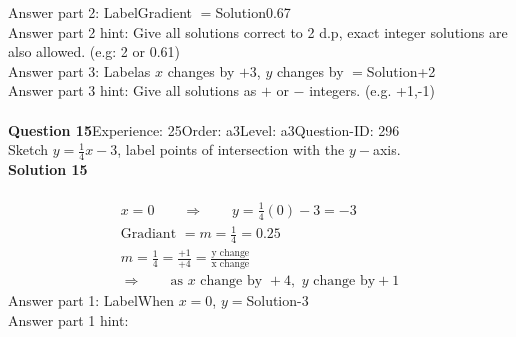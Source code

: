 \documentclass{article}
\begin{document}
Answer part 2: \hspace{10pt}Label\hspace{10pt}Gradient $=$\hspace{10pt}Solution\hspace{10pt}0.67\\
Answer part 2 hint: \hspace{15pt}Give all solutions correct to 2 d.p, exact integer solutions are also allowed. (e.g: 2 or 0.61)\\
Answer part 3: \hspace{10pt}Label\hspace{10pt}as $x$ changes by $+3$, $y$ changes by $=$\hspace{10pt}Solution\hspace{10pt}+2\\
Answer part 3 hint: \hspace{15pt}Give all solutions as $+$ or $-$ integers. (e.g. +1,-1)\\
\\[4pt]
\noindent\textbf{Question 15}\hspace{20pt}Experience: 25\hspace{20pt}Order: a3\hspace{20pt}Level: a3\hspace{20pt}Question-ID: 296\\[2pt]
Sketch $y=\displaystyle\frac{1}{4}x-3$, label points of intersection with the $y-$axis.\\[4pt]
\noindent\textbf{Solution 15}\\[2pt]
\\[-35pt]\begin{align*}
&x=0\qquad\Rightarrow\qquad y=\displaystyle\frac{1}{4}(0)-3=-3&\\[2pt]
&\text{Gradiant}\,\,=m=\displaystyle\frac{1}{4}=0.25&\\[2pt]
&m=\displaystyle\frac{1}{4}=\displaystyle\frac{+1}{+4}=\displaystyle\frac{\text{y change}}{\text{x change}}&\\[2pt]
& \Rightarrow\qquad \text{as}\,\, x \,\,\text{change by } +4,\,\, y\,\, \text{change by} +1 &
\end{align*}
Answer part 1: \hspace{10pt}Label\hspace{10pt}When $x=0$, $y=$\hspace{10pt}Solution\hspace{10pt}-3\\
Answer part 1 hint: \hspace{15pt}\\
\end{document}
